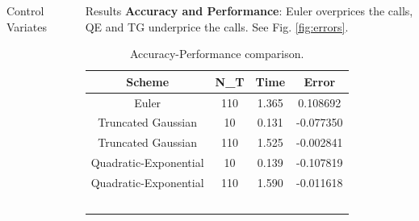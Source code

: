 \documentclass[]{beamer}
\begin{document}
\begin{frame}[t]
\begin{columns}[t]
\begin{column}{\twocolwid}
\begin{columns}[t,totalwidth=\twocolwid]
\begin{column}{\onecolwid}
\begin{block}{Control Variates}
    \end{block}
    
    
    \end{column} %
    
    \end{columns} %
    
    \end{column} %
    
    \begin{column}{\sepwid}\end{column} %
    
    \begin{column}{\onecolwid} %
    
    
    \begin{block}{Results}
        \textbf{Accuracy and Performance}: Euler overprices the calls, QE and TG underprice the calls. See Fig. \ref*{fig:errors}. 
        \begin{table}
        \vspace{2ex}
        \begin{tabular}{c c c c}
            \hline
            \textbf{Scheme} & \textbf{N\_T} & \textbf{Time} & \textbf{Error}\\
            \hline
            Euler                 &      110      &    1.365      &    0.108692   \\\hline
            Truncated Gaussian    &      10       &    0.131      &    -0.077350  \\
            Truncated Gaussian    &      110      &    1.525      &    -0.002841  \\\hline
            Quadratic-Exponential &      10       &    0.139      &    -0.107819  \\
            Quadratic-Exponential &      110      &    1.590      &    -0.011618  \\
            \hline
            \
        \end{tabular}
        \caption{Accuracy-Performance comparison.}
        \end{table}


\end{block}
\end{column}
\end{columns}
\end{frame}
\end{document}
